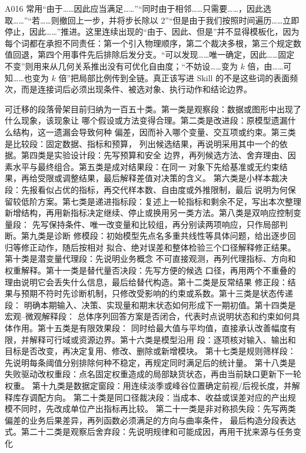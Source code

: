 \documentclass[UTF8,a4paper,12pt]{ctexart}
\begin{document}
A016 常用“由于……因此应当满足……”“同时由于相邻……只需要……，因此选取……”“若……则撤回上一步，并将步长除以 2”“但是由于我们按照时间遍历……立即停止，因此……”推进。这里连续出现的“由于、因此、但是”并不显得模板化，因为每个词都在承担不同责任：第一个引入物理顺序，第二个裁决多根，第三个规定数值回退，第四个用事件先后排除后发分支。“可以发现……唯一确定，因此……固定不变”则用来从几何关系推出没有可优化自由度；“不妨设……变为 $k$ 倍，由……可知……也变为 $k$ 倍”把局部比例传到全链。真正该写进 Skill 的不是这些词的表面频次，而是连接词后必须出现条件、被选对象、执行动作和结论边界。

可迁移的段落骨架目前归纳为一百五十类。第一类是观察段：数据或图形中出现了什么现象，该现象让
哪个假设或方法变得合理。第二类是改进段：原模型遗漏什么结构，这一遗漏会导致何种
偏差，因而补入哪个变量、交互项或约束。第三类是比较段：固定数据、指标和预算，
列出候选结果，再说明采用其中一个的依据。第四类是实验设计段：先写预算和安全
边界，再列候选方法、舍弃理由、因素水平与最终组合。第五类是成对结果段：在同一
对象下先给基准或无约束结果，再给受限或调整结果，最后解释差值对决策的含义。
第六类是小样本裁决段：先报看似占优的指标，再交代样本数、自由度或外推限制，最后
说明为何保留较低阶方案。第七类是递进指标段：复述上一轮指标和剩余不足，写出本次整理
新增结构，再用新指标决定继续、停止或换用另一类方法。第八类是双响应控制变量段：
先写保持条件、唯一改变量和比较组，再分别读两项响应，只作局部判断。第九类是诊断
修模段：初始模型先点名多重共线性等具体问题，给出逐步回归等修正动作，随后按相对
拟合、绝对误差和整体检验三个口径解释修正结果。第十类是潜变量代理段：先说明业务概念
不可直接观测，再列代理指标、方向和权重解释。第十一类是替代量否决段：先写方便的候选
口径，再用两个不重叠的理由说明它会丢失什么信息，最后给替代构造。第十二类是反常结果
修正段：结果与预期不符时先诊断机制，只修改受影响的约束或系数。第十三类是状态传递段：
明确本期输入、决策、实现量和期末状态如何形成下一期初值。第十四类是宏观--微观解释段：
总体序列回答方案是否闭合，代表时点说明状态和约束如何具体作用。第十五类是有限效果段：
同时给最大值与平均值，直接承认改善幅度有限，并解释可行域或资源边界。第十六类是模型沿用
段：逐项核对输入、输出和目标是否改变，再决定复用、修改、删除或新增模块。
第十七类是规则筛样段：先说明每条阈值分别排除何种不稳定，再规定同时满足后的统计量。
第十八类是失败驱动改权重段：点名固定权重造成的局部缺货状态，再由当前缺口更新下一轮权重。
第十九类是数据定窗段：用连续淡季或峰谷位置确定前视/后视长度，并解释库存调配方向。
第二十类是同口径裁决段：当成本、收益或误差对应的产出规模不同时，先改成单位产出指标再比较。
第二十一类是非对称损失段：先写两类偏差的业务后果差异，再列函数必须满足的方向与曲率条件，
最后构造分段表达式。第二十二类是观察后舍弃段：先说明规律和可能成因，再用干扰来源与任务变化
\end{document}
